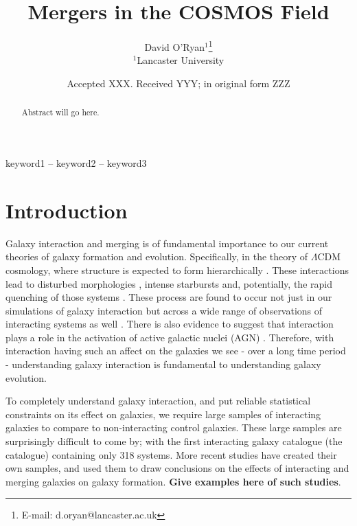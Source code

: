 \documentclass[fleqn,usenatbib]{mnras}
\title[Mergers in COSMOS]{Mergers in the COSMOS Field}
\author[D. O'Ryan et al.]{
David O'Ryan$^{1}$\thanks{E-mail: d.oryan@lancaster.ac.uk}
\\
$^{1}$Lancaster University \\
}
\date{Accepted XXX. Received YYY; in original form ZZZ}
\begin{document}
\label{firstpage}
\pagerange{\pageref{firstpage}--\pageref{lastpage}}
\maketitle

\begin{abstract}
   Abstract will go here.
\end{abstract}

\begin{keywords}
keyword1 -- keyword2 -- keyword3
\end{keywords}


\section{Introduction}\label{introduction}
 Galaxy interaction and merging is of fundamental importance to our current theories of galaxy formation and evolution. Specifically, in the theory of $\Lambda$CDM cosmology, where structure is expected to form hierarchically \cite{normal cosmology papers}. These interactions lead to disturbed morphologies \citep{normal disturbed morphology papers}, intense starbursts \citep{normal starburst papers} and, potentially, the rapid quenching of those systems \citep{normal quenching papers}. These process are found to occur not just in our simulations of galaxy interaction \citep{new simulation papers} but across a wide range of observations of interacting systems as well \citep{new observation papers}. There is also evidence to suggest that interaction plays a role in the activation of active galactic nuclei (AGN) \citep{normal papers on AGN activation}. Therefore, with interaction having such an affect on the galaxies we see - over a long time period - understanding galaxy interaction is fundamental to understanding galaxy evolution.
 
 To completely understand galaxy interaction, and put reliable statistical constraints on its effect on galaxies, we require large samples of interacting galaxies to compare to non-interacting control galaxies. These large samples are surprisingly difficult to come by; with the first interacting galaxy catalogue (the \citet{1966ApJS...14....1A} catalogue) containing only 318 systems. More recent studies have created their own samples, and used them to draw conclusions on the effects of interacting and merging galaxies on galaxy formation. \textbf{Give examples here of such studies}.
 
\end{document}
